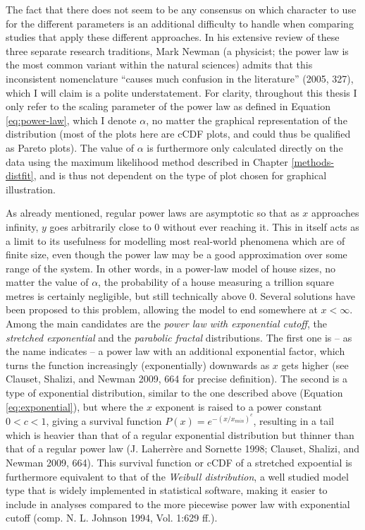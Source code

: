 \documentclass[
  12pt,
  a4paper, twoside]{book}
\begin{document}
The fact that there does not seem to be any consensus on which character to use for the different parameters is an additional difficulty to handle when comparing studies that apply these different approaches. In his extensive review of these three separate research traditions, Mark Newman (a physicist; the power law is the most common variant within the natural sciences) admits that this inconsistent nomenclature ``causes much confusion in the literature'' (2005, 327), which I will claim is a polite understatement. For clarity, throughout this thesis I only refer to the scaling parameter of the power law as defined in Equation \eqref{eq:power-law}, which I denote \(\alpha\), no matter the graphical representation of the distribution (most of the plots here are cCDF plots, and could thus be qualified as Pareto plots). The value of \(\alpha\) is furthermore only calculated directly on the data using the maximum likelihood method described in Chapter \ref{methods-distfit}, and is thus not dependent on the type of plot chosen for graphical illustration.

As already mentioned, regular power laws are asymptotic so that as \(x\) approaches infinity, \(y\) goes arbitrarily close to \(0\) without ever reaching it. This in itself acts as a limit to its usefulness for modelling most real-world phenomena which are of finite size, even though the power law may be a good approximation over some range of the system. In other words, in a power-law model of house sizes, no matter the value of \(\alpha\), the probability of a house measuring a trillion square metres is certainly negligible, but still technically above \(0\). Several solutions have been proposed to this problem, allowing the model to end somewhere at \(x < \infty\). Among the main candidates are the \emph{power law with exponential cutoff}, the \emph{stretched exponential} and the \emph{parabolic fractal} distributions. The first one is -- as the name indicates -- a power law with an additional exponential factor, which turns the function increasingly (exponentially) downwards as \(x\) gets higher (see Clauset, Shalizi, and Newman 2009, 664 for precise definition). The second is a type of exponential distribution, similar to the one described above (Equation \eqref{eq:exponential}), but where the \(x\) exponent is raised to a power constant \(0 < c <1\), giving a survival function \(P(x) = e^{-(x/x_{min})^c}\), resulting in a tail which is heavier than that of a regular exponential distribution but thinner than that of a regular power law (J. Laherrère and Sornette 1998; Clauset, Shalizi, and Newman 2009, 664). This survival function or cCDF of a stretched expoential is furthermore equivalent to that of the \emph{Weibull distribution}, a well studied model type that is widely implemented in statistical software, making it easier to include in analyses compared to the more piecewise power law with exponential cutoff (comp. N. L. Johnson 1994, Vol. 1:629 ff.).
\end{document}
